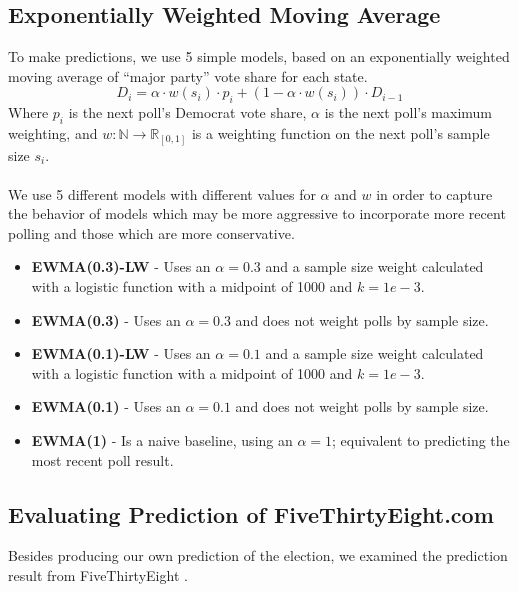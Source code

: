 \subsection{Exponentially Weighted Moving Average}
To make predictions, we use 5 simple models, based on an exponentially weighted moving average of ``major party'' vote share for each state.
$$
D_i = \alpha\cdot w(s_i) \cdot p_{i} + (1-\alpha\cdot w(s_i)) \cdot D_{i-1}
$$
Where $p_i$ is the next poll's Democrat vote share, $\alpha$ is the next poll's maximum weighting, and $w: \mathbb{N} \rightarrow \mathbb{R}_{[0, 1]}$ is a weighting function on the next poll's sample size $s_i$.
\\~\\
We use 5 different models with different values for $\alpha$ and $w$ in order to capture the behavior of models which may be more aggressive to incorporate more recent polling and those which are more conservative. 

\begin{itemize}
    \item {\bf EWMA(0.3)-LW} - Uses an $\alpha = 0.3$ and a sample size weight calculated with a logistic function with a midpoint of 1000 and $k=1e-3$.
    \item {\bf EWMA(0.3)} - Uses an $\alpha = 0.3$ and does not weight polls by sample size.
    \item {\bf EWMA(0.1)-LW} - Uses an $\alpha = 0.1$ and a sample size weight calculated with a logistic function with a midpoint of 1000 and $k=1e-3$.
    \item {\bf EWMA(0.1)} - Uses an $\alpha = 0.1$ and does not weight polls by sample size.
    \item {\bf EWMA(1)} - Is a naive baseline, using an $\alpha = 1$; equivalent to predicting the most recent poll result.
\end{itemize}


\subsection{Evaluating Prediction of FiveThirtyEight.com}

Besides producing our own prediction of the election, we examined the prediction result from FiveThirtyEight \cite{fivethirtyeight}. 


